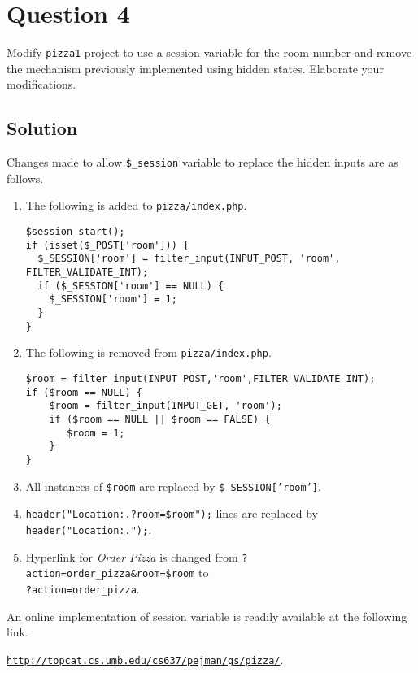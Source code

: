 
\section*{Question 4}

Modify \texttt{pizza1} project to use a session variable for the room number and remove the mechanism previously implemented using hidden states. Elaborate your modifications.

\subsection*{Solution}

Changes made to allow \texttt{\$\_session} variable to replace the hidden inputs are as follows.

\begin{enumerate}[itemsep=1mm]\parskip=0pt
\item The following is added to \texttt{pizza/index.php}.
\lstset{language=php}
\begin{lstlisting}
$session_start();
if (isset($_POST['room'])) {
  $_SESSION['room'] = filter_input(INPUT_POST, 'room', FILTER_VALIDATE_INT);
  if ($_SESSION['room'] == NULL) {
    $_SESSION['room'] = 1;
  }
}
\end{lstlisting}

\item The following is removed from \texttt{pizza/index.php}.
\lstset{language=php}
\begin{lstlisting}
$room = filter_input(INPUT_POST,'room',FILTER_VALIDATE_INT);
if ($room == NULL) {
    $room = filter_input(INPUT_GET, 'room');
    if ($room == NULL || $room == FALSE) {
       $room = 1;
    }
}
\end{lstlisting}
\item All instances of \texttt{\$room} are replaced by \texttt{\$\_SESSION['room']}.

\item \texttt{header("Location:.?room=\$room");} lines are replaced by \texttt{header("Location:.");}.

\item Hyperlink for \textit{Order Pizza} is changed from \texttt{?action=order\_pizza\&room=\$room} to\\ \texttt{?action=order\_pizza}.
\end{enumerate}
An online implementation of session variable is readily available at the following link.

\href{http://topcat.cs.umb.edu/cs637/pejman/gs/pizza/}{\texttt{http://topcat.cs.umb.edu/cs637/pejman/gs/pizza/}}.

